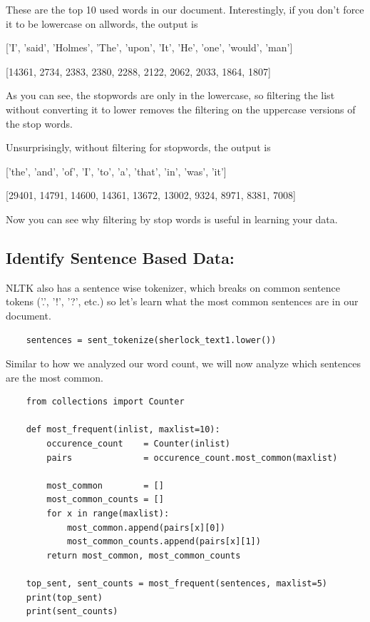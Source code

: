 \documentclass{article}
\begin{document}
These are the top 10 used words in our document. Interestingly, if you don't force it to be lowercase on allwords, the output is 

['I', 'said', 'Holmes', 'The', 'upon', 'It', 'He', 'one', 'would', 'man']

[14361, 2734, 2383, 2380, 2288, 2122, 2062, 2033, 1864, 1807]

As you can see, the stopwords are only in the lowercase, so filtering the list without converting it to lower removes the filtering on the uppercase versions of the stop words. 

Unsurprisingly, without filtering for stopwords, the output is 

['the', 'and', 'of', 'I', 'to', 'a', 'that', 'in', 'was', 'it']

[29401, 14791, 14600, 14361, 13672, 13002, 9324, 8971, 8381, 7008]

Now you can see why filtering by stop words is useful in learning your data.

\subsection{Identify Sentence Based Data:}

NLTK also has a sentence wise tokenizer, which breaks on common sentence tokens ('.', '!', '?', etc.) so let's learn what the most common sentences are in our document.

\begin{verbatim}
    sentences = sent_tokenize(sherlock_text1.lower())
\end{verbatim}

Similar to how we analyzed our word count, we will now analyze which sentences are the most common. 

\begin{verbatim}
    from collections import Counter

    def most_frequent(inlist, maxlist=10):
        occurence_count    = Counter(inlist)
        pairs              = occurence_count.most_common(maxlist)

        most_common        = []
        most_common_counts = []
        for x in range(maxlist):
            most_common.append(pairs[x][0])
            most_common_counts.append(pairs[x][1])
        return most_common, most_common_counts

    top_sent, sent_counts = most_frequent(sentences, maxlist=5)
    print(top_sent)
    print(sent_counts)
\end{verbatim}
\end{document}
